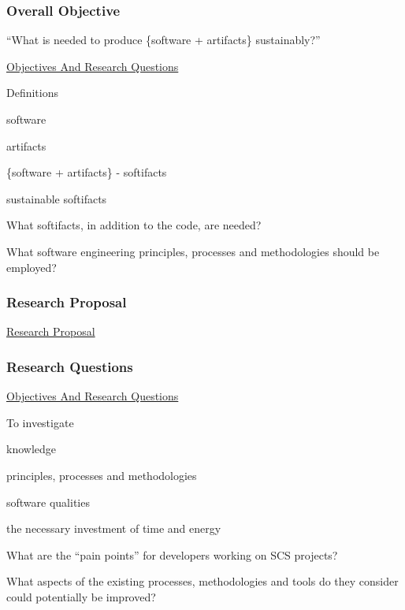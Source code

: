 \documentclass[t,12pt,numbers,fleqn]{beamer}
\begin{document}
\begin{frame}
\frametitle{Overall Objective}

``What is needed to produce \{software + artifacts\} sustainably?''

\href{https://github.com/smiths/AIMSS/blob/master/OverallResearchProposal/ObjectivesAndResearchQuestions.pdf}{Objectives
And Research Questions}

\bi
\item Definitions
\bi
\item software
\item artifacts
\item \{software + artifacts\} - softifacts
\item sustainable softifacts
\ei
\item What softifacts, in addition to the code, are needed?
\item What software engineering principles, processes and methodologies should be employed?
\ei

\end{frame}


\begin{frame}
\frametitle{Research Proposal}

\href{https://github.com/smiths/AIMSS/blob/master/OverallResearchProposal/ResearchProposal.pdf}{Research
Proposal}

\end{frame}


\begin{frame}
\frametitle{Research Questions}

\href{https://github.com/smiths/AIMSS/blob/master/OverallResearchProposal/ObjectivesAndResearchQuestions.pdf}{Objectives
And Research Questions}

\bi
\item To investigate
\bi
\item knowledge
\item principles, processes and methodologies
\item software qualities
\item the necessary investment of time and energy
\ei
\item What are the ``pain points'' for
developers working on SCS projects?
\item What aspects of the existing processes, methodologies and tools do they consider could potentially be improved?
\ei

\end{frame}
\end{document}
